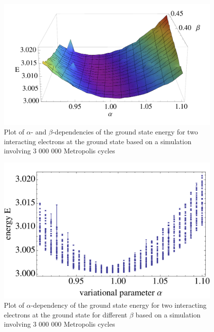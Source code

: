 \begin{figure}[htbp]
    \centering
    \includegraphics[scale=0.45]{2electron}
    \caption{Plot of $\alpha$- and $\beta$-dependencies of the ground state energy for two interacting electrons at the ground state based on a simulation involving 3 000 000 Metropolis cycles}
    \label{fig:2electron}
\end{figure}
\begin{figure}[htbp]
    \centering
    \includegraphics[scale=0.45]{2electronalpha}
    \caption{Plot of $\alpha$-dependency of the ground state energy for two interacting electrons at the ground state for different $\beta$ based on a simulation involving 3 000 000 Metropolis cycles}
    \label{fig:2electronalpha}
\end{figure}
